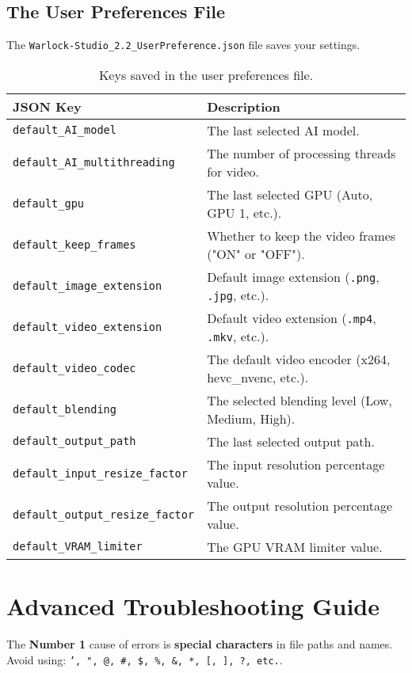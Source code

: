 \documentclass[11pt, a4paper]{article}
\newcommand{\inlinecode}[1]{\colorbox{WarlockLightGray}{\small\texttt{#1}}}
\begin{document}
\subsection{The User Preferences File}
The \inlinecode{Warlock-Studio_2.2_UserPreference.json} file saves your settings.
\begin{table}[H]
    \centering
    \small %
    \begin{tabularx}{\textwidth}{l X}
        \toprule
        \textbf{JSON Key} & \textbf{Description} \\
        \midrule
        \texttt{default\_AI\_model} & The last selected AI model. \\
        \texttt{default\_AI\_multithreading} & The number of processing threads for video. \\
        \texttt{default\_gpu} & The last selected GPU (Auto, GPU 1, etc.). \\
        \texttt{default\_keep\_frames} & Whether to keep the video frames ("ON" or "OFF"). \\
        \texttt{default\_image\_extension} & Default image extension (\texttt{.png}, \texttt{.jpg}, etc.). \\
        \texttt{default\_video\_extension} & Default video extension (\texttt{.mp4}, \texttt{.mkv}, etc.). \\
        \texttt{default\_video\_codec} & The default video encoder (x264, hevc\_nvenc, etc.). \\
        \texttt{default\_blending} & The selected blending level (Low, Medium, High). \\
        \texttt{default\_output\_path} & The last selected output path. \\
        \texttt{default\_input\_resize\_factor} & The input resolution percentage value. \\
        \texttt{default\_output\_resize\_factor} & The output resolution percentage value. \\
        \texttt{default\_VRAM\_limiter} & The GPU VRAM limiter value. \\
        \bottomrule
    \end{tabularx}
    \caption{Keys saved in the user preferences file.}
\end{table}

\section{Advanced Troubleshooting Guide}
\begin{warnbox}
The \textbf{Number 1} cause of errors is \textbf{special characters} in file paths and names. Avoid using: \texttt{', ", @, \#, \$, \%, \&, *, [, ], ?, etc.}.
\end{warnbox}
\end{document}
